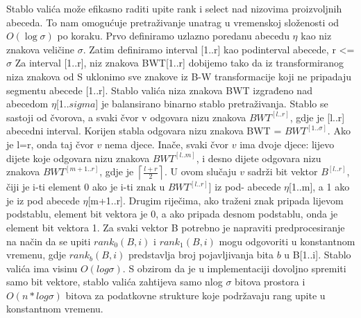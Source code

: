 \documentclass[a4paper,12pt]{article}
\begin{document}
Stablo valića može efikasno raditi upite rank i select nad nizovima proizvoljnih abeceda. To nam omogućuje pretraživanje unatrag u vremenskoj složenosti od  $O(\log\sigma)$ po koraku.
Prvo definiramo uzlazno poredanu abecedu $\eta$ kao niz znakova veličine $\sigma $.  
Zatim definiramo interval [1..r] kao podinterval abecede, r <= $\sigma$
Za interval [1..r], niz znakova BWT[1..r] dobijemo tako da iz transformiranog niza znakova od S uklonimo sve znakove iz B-W transformacije koji ne pripadaju segmentu abecede [1..r]. Stablo valića niza znakova BWT izgrađeno nad abecedom $\eta$[1..$sigma$] je balansirano binarno stablo pretraživanja. Stablo se sastoji od čvorova, a svaki čvor v odgovara nizu znakova $BWT^{[l..r]}$, gdje je [l..r] abecedni interval. Korijen stabla odgovara nizu znakova BWT = $BWT^{[1..\sigma]}$. Ako je l=r, onda taj čvor $v$ nema djece. Inače, svaki čvor $v$ ima dvoje djece: lijevo dijete koje odgovara nizu znakova $BWT^{[l..m]}$, i desno dijete odgovara nizu znakova $BWT^{[m+1..r]}$, gdje je $\left \lceil{\frac{l+r}{2}}\right \rceil$. U ovom slučaju $v$ sadrži bit vektor $B^{[l..r]}$, čiji je i-ti element 0 ako je i-ti znak u $BWT^{[l..r]}]$ iz pod- abecede $\eta$[1..m], a 1 ako je iz pod abecede $\eta$[m+1..r]. Drugim riječima, ako traženi znak pripada lijevom podstablu, element bit vektora je 0, a ako pripada desnom podstablu, onda je element bit vektora 1. Za svaki vektor B potrebno je napraviti predprocesiranje na način da se upiti $rank_0(B,i)$ i $rank_1(B,i)$ mogu odgovoriti u konstantnom vremenu, gdje $rank_b(B,i)$ predstavlja broj pojavljivanja bita $b$ u B[1..i]. Stablo valića ima visinu $O(log\sigma)$. S obzirom da je u implementaciji dovoljno spremiti samo bit vektore, stablo valića zahtijeva samo nlog $\sigma$ bitova prostora i $O(n*log\sigma)$ bitova za podatkovne strukture koje podržavaju rang upite u konstantnom vremenu.  

\end{document}
